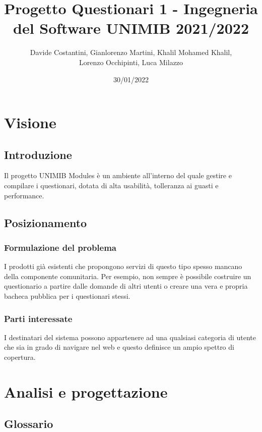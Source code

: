 \documentclass[12pt]{article}
\title{ Progetto Questionari 1 - Ingegneria del Software  UNIMIB 2021/2022} %
\author{Davide Costantini, Gianlorenzo Martini, Khalil Mohamed Khalil, \\ Lorenzo Occhipinti, Luca Milazzo} %
\date{30/01/2022} %
\begin{document}
	
	\maketitle %
	\newpage
	\tableofcontents \newpage
	\section{Visione}
	\subsection{Introduzione}
	Il progetto UNIMIB Modules è un ambiente all'interno del quale gestire e compilare i questionari, dotata di alta usabilità, tolleranza ai guasti e performance.
	\subsection{Posizionamento}
	\subsubsection{Formulazione del problema}
	I prodotti già esistenti che propongono servizi di questo tipo spesso mancano della componente comunitaria. Per esempio, non sempre è possibile costruire un questionario a partire dalle domande di altri utenti o creare una vera e propria bacheca pubblica per i questionari stessi.
	\subsubsection{Parti interessate}
	I destinatari del sistema possono appartenere ad una qualsiasi categoria di utente che sia in grado di navigare nel web e questo definisce un ampio spettro di copertura.
	
	\section{Analisi e progettazione}
	\subsection{Glossario}
	
\end{document}
